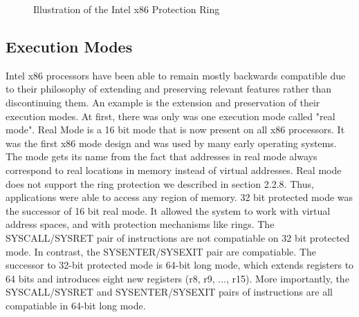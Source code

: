\documentclass{report}
\begin{document}
\begin{spacing}{1.5}
{\begin{figure}[ht]
\begin{center}
\end{center}
\caption{Illustration of the Intel x86 Protection Ring}
\end{figure}
}
















\subsection{Execution Modes}

{\large
Intel x86 processors have been able to remain mostly backwards compatible due to their philosophy of extending and preserving relevant features rather than discontinuing them. An example is the extension and preservation of their execution modes. At first, there was only was one execution mode called "real mode". Real Mode is a 16 bit mode that is now present on all x86 processors. It was the first x86 mode design and was used by many early operating systems. The mode gets its name from the fact that addresses in real mode always correspond to real locations in memory instead of virtual addresses. Real mode does not support the ring protection we described in section 2.2.8. Thus, applications were able to access any region of memory. 32 bit protected mode was the successor of 16 bit real mode. It allowed the system to work with virtual address spaces, and with protection mechanisms like rings. The SYSCALL/SYSRET pair of instructions are not compatiable on 32 bit protected mode. In contrast, the SYSENTER/SYSEXIT pair are compatiable. The successor to 32-bit protected mode is 64-bit long mode, which extends registers to 64 bits and introduces eight new registers (r8, r9, ..., r15). More importantly, the SYSCALL/SYSRET and SYSENTER/SYSEXIT pairs of instructions are all compatiable in 64-bit long mode.
\newline
}



\end{spacing}
\end{document}
